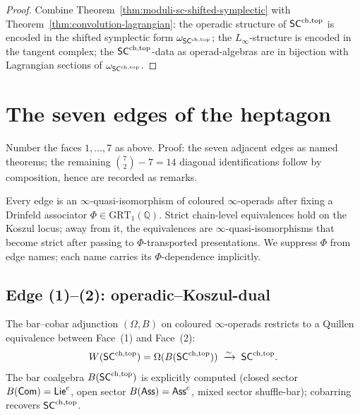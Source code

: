 \begin{proof}
Combine Theorem~\ref{thm:moduli-sc-shifted-symplectic} with
Theorem~\ref{thm:convolution-lagrangian}: the operadic structure of
$\mathsf{SC}^{\mathrm{ch},\mathrm{top}}$ is encoded in the shifted symplectic form
$\omega_{\mathsf{SC}^{\mathrm{ch},\mathrm{top}}}$; the $L_\infty$-structure is encoded in the
tangent complex; the $\mathsf{SC}^{\mathrm{ch},\mathrm{top}}$-data as operad-algebras are in
bijection with Lagrangian sections of $\omega_{\mathsf{SC}^{\mathrm{ch},\mathrm{top}}}$.
\end{proof}

\section{The seven edges of the heptagon}
\label{sec:heptagon-edges}

Number the faces $1,\dots,7$ as above. Proof: the seven adjacent
edges as named theorems; the remaining $\binom{7}{2}-7=14$ diagonal
identifications follow by composition, hence are recorded as
remarks.

\begin{convention}\label{conv:edge-regime}
Every edge is an $\infty$-quasi-isomorphism of coloured
$\infty$-operads after fixing a Drinfeld associator
$\Phi\in\mathrm{GRT}_1(\mathbb{Q})$. Strict chain-level equivalences
hold on the Koszul locus; away from it, the equivalences are
$\infty$-quasi-isomorphisms that become strict after passing to
$\Phi$-transported presentations. We suppress $\Phi$ from edge names;
each name carries its $\Phi$-dependence implicitly.
\end{convention}

\subsection{Edge (1)--(2): operadic--Koszul-dual}\label{subsec:edge-12}

\begin{theorem}\label{thm:edge-12}%
The bar--cobar adjunction
$(\Omega,B)$ on coloured $\infty$-operads restricts to a
Quillen equivalence between Face~(1) and Face~(2):
\begin{equation}
 W(\mathsf{SC}^{\mathrm{ch},\mathrm{top}})=\Omega(B(\mathsf{SC}^{\mathrm{ch},\mathrm{top}}))
 \;\xrightarrow{\sim}\;
 \mathsf{SC}^{\mathrm{ch},\mathrm{top}}.
\end{equation}
The bar coalgebra $B(\mathsf{SC}^{\mathrm{ch},\mathrm{top}})$ is explicitly computed (closed
sector $B(\mathsf{Com})=\mathsf{Lie}^c$, open sector $B(\mathsf{Ass})=\mathsf{Ass}^c$, mixed sector
shuffle-bar); cobarring recovers $\mathsf{SC}^{\mathrm{ch},\mathrm{top}}$.
\end{theorem}

